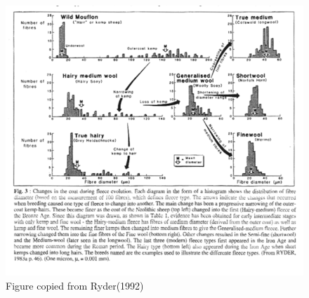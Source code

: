 %

\begin{figure}[!h]
  \centering
   \includegraphics[width=1.0\textwidth]{ryder1crop.png}
  \caption{Figure copied from Ryder(1992)~\cite{ryde:92}}
  \label{fig:ryder}
\end{figure}

%

